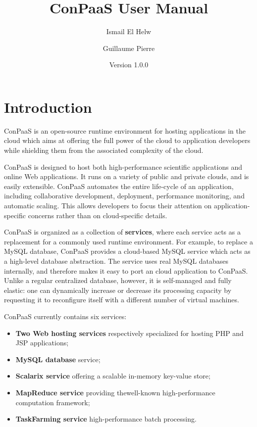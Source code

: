 \documentclass[10pt]{article}
\begin{document}
\title{ConPaaS User Manual}
\author{Ismail El Helw \and Guillaume Pierre}
\date{Version 1.0.0}
\maketitle

\newpage
\tableofcontents
\newpage

\section{Introduction}

ConPaaS is an open-source runtime environment for hosting applications
in the cloud which aims at offering the full power of the cloud to
application developers while shielding them from the associated
complexity of the cloud.

ConPaaS is designed to host both high-performance scientific
applications and online Web applications. It runs on a variety of
public and private clouds, and is easily extensible.  ConPaaS
automates the entire life-cycle of an application, including
collaborative development, deployment, performance monitoring, and
automatic scaling. This allows developers to focus their attention on
application-specific concerns rather than on cloud-specific details.

ConPaaS is organized as a collection of \textbf{services}, where each
service acts as a replacement for a commonly used runtime environment.
For example, to replace a MySQL database, ConPaaS provides a
cloud-based MySQL service which acts as a high-level database
abstraction. The service uses real MySQL databases internally, and
therefore makes it easy to port an cloud application to ConPaaS.
Unlike a regular centralized database, however, it is self-managed and
fully elastic: one can dynamically increase or decrease its processing
capacity by requesting it to reconfigure itself with a different
number of virtual machines.

ConPaaS currently contains six services: 

\begin{itemize}
\item \textbf{Two Web hosting services} respectively specialized for
  hosting PHP and JSP applications;
\item \textbf{MySQL database} service;
\item \textbf{Scalarix service} offering a scalable in-memory
  key-value store;
\item \textbf{MapReduce service} providing thewell-known
  high-performance computation framework;
\item \textbf{TaskFarming service} high-performance batch processing.
\end{itemize}
\end{document}

